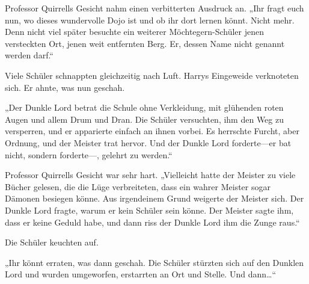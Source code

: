 Professor Quirrells Gesicht nahm einen verbitterten Ausdruck an. „Ihr fragt euch nun, wo dieses wundervolle Dojo ist und ob ihr dort lernen könnt. Nicht mehr. Denn nicht viel später besuchte ein weiterer Möchtegern-Schüler jenen versteckten Ort, jenen weit entfernten Berg. Er, dessen Name nicht genannt werden darf.“

Viele Schüler schnappten gleichzeitig nach Luft. Harrys Eingeweide verknoteten sich. Er ahnte, was nun geschah.

„Der Dunkle Lord betrat die Schule ohne Verkleidung, mit glühenden roten Augen und allem Drum und Dran. Die Schüler versuchten, ihm den Weg zu versperren, und er apparierte einfach an ihnen vorbei. Es herrschte Furcht, aber Ordnung, und der Meister trat hervor. Und der Dunkle Lord forderte—er bat nicht, sondern forderte—, gelehrt zu werden.“

Professor Quirrells Gesicht war sehr hart. „Vielleicht hatte der Meister zu viele Bücher gelesen, die die Lüge verbreiteten, dass ein wahrer Meister sogar Dämonen besiegen könne. Aus irgendeinem Grund weigerte der Meister sich. Der Dunkle Lord fragte, warum er kein Schüler sein könne. Der Meister sagte ihm, dass er keine Geduld habe, und dann riss der Dunkle Lord ihm die Zunge raus.“

Die Schüler keuchten auf.

„Ihr könnt erraten, was dann geschah. Die Schüler stürzten sich auf den Dunklen Lord und wurden umgeworfen, erstarrten an Ort und Stelle. Und dann…“

